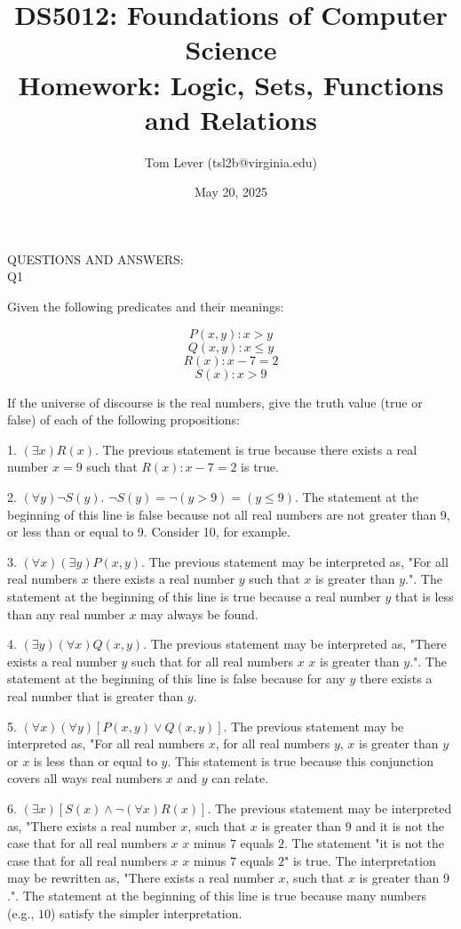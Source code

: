 \documentclass{article}
\title{DS5012: Foundations of Computer Science\\\Large Homework: Logic, Sets, Functions and Relations}
\author{Tom Lever (tsl2b@virginia.edu)}
\date{May 20, 2025}
\begin{document}
\maketitle

QUESTIONS AND ANSWERS:\\

Q1

Given the following predicates and their meanings:

\[P(x, y): x > y\]
\[Q(x, y): x \leq y\]
\[R(x): x - 7 = 2\]
\[S(x): x > 9\]

If the universe of discourse is the real numbers, give the truth value (true
or false) of each of the following propositions:

1. \((\exists x) R(x)\). The previous statement is true because there exists a real number \(x = 9\) such that \(R(x): x - 7 = 2\) is true.

2. \((\forall y) \neg S(y)\). \(\neg S(y) = \neg (y > 9) = (y \leq 9)\). The statement at the beginning of this line is false because not all real numbers are not greater than 9, or less than or equal to 9. Consider 10, for example.

3. \((\forall x)(\exists y) P(x, y)\). The previous statement may be interpreted as, "For all real numbers \(x\) there exists a real number \(y\) such that \(x\) is greater than \(y\).". The statement at the beginning of this line is true because a real number \(y\) that is less than any real number \(x\) may always be found.

4. \((\exists y) (\forall x) Q(x, y)\). The previous statement may be interpreted as, "There exists a real number \(y\) such that for all real numbers \(x\) \(x\) is greater than \(y\).". The statement at the beginning of this line is false because for any \(y\) there exists a real number that is greater than \(y\).

5. \((\forall x) (\forall y) [P(x, y) \lor Q(x, y)]\). The previous statement may be interpreted as, "For all real numbers \(x\), for all real numbers \(y\), \(x\) is greater than \(y\) or \(x\) is less than or equal to \(y\). This statement is true because this conjunction covers all ways real numbers \(x\) and \(y\) can relate.

6. \((\exists x) [S(x) \land \neg (\forall x) R(x)]\). The previous statement may be interpreted as, "There exists a real number \(x\), such that \(x\) is greater than \(9\) and it is not the case that for all real numbers \(x\) \(x\) minus \(7\) equals \(2\). The statement "it is not the case that for all real numbers \(x\) \(x\) minus \(7\) equals \(2\)" is true. The interpretation may be rewritten as, "There exists a real number \(x\), such that \(x\) is greater than \(9\).". The statement at the beginning of this line is true because many numbers (e.g., \(10\)) satisfy the simpler interpretation.
\end{document}
